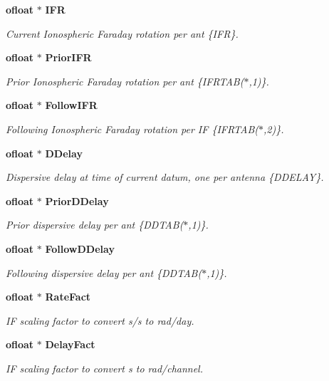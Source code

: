 \begin{CompactItemize}
{\bf ofloat} $\ast$ {\bf IFR}
\begin{CompactList}\small\item\em Current Ionospheric Faraday rotation per ant \{IFR\}. \item\end{CompactList}\item 
{\bf ofloat} $\ast$ {\bf Prior\-IFR}
\begin{CompactList}\small\item\em Prior Ionospheric Faraday rotation per ant \{IFRTAB($\ast$,1)\}. \item\end{CompactList}\item 
{\bf ofloat} $\ast$ {\bf Follow\-IFR}
\begin{CompactList}\small\item\em Following Ionospheric Faraday rotation per IF \{IFRTAB($\ast$,2)\}. \item\end{CompactList}\item 
{\bf ofloat} $\ast$ {\bf DDelay}
\begin{CompactList}\small\item\em Dispersive delay at time of current datum, one per antenna \{DDELAY\}. \item\end{CompactList}\item 
{\bf ofloat} $\ast$ {\bf Prior\-DDelay}
\begin{CompactList}\small\item\em Prior dispersive delay per ant \{DDTAB($\ast$,1)\}. \item\end{CompactList}\item 
{\bf ofloat} $\ast$ {\bf Follow\-DDelay}
\begin{CompactList}\small\item\em Following dispersive delay per ant \{DDTAB($\ast$,1)\}. \item\end{CompactList}\item 
{\bf ofloat} $\ast$ {\bf Rate\-Fact}
\begin{CompactList}\small\item\em IF scaling factor to convert s/s to rad/day. \item\end{CompactList}\item 
{\bf ofloat} $\ast$ {\bf Delay\-Fact}
\begin{CompactList}\small\item\em IF scaling factor to convert s to rad/channel. \item\end{CompactList}\item 

\end{CompactItemize}
